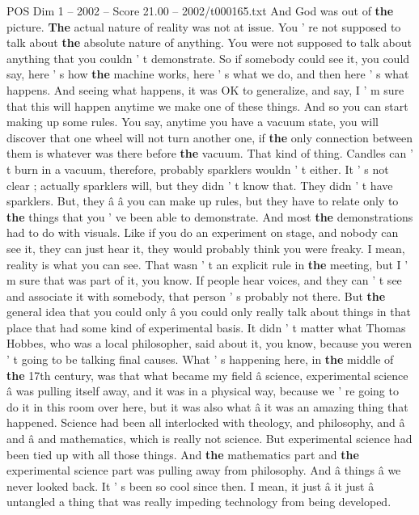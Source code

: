 \begin{textsample}{POS Dim 1 – 2002 – Score 21.00 – 2002/t000165.txt}
And God was out of \textbf{the} picture. \textbf{The} actual nature of reality was not at issue.
You ' re not supposed to talk about \textbf{the} absolute nature of anything.
You were not supposed to talk about anything that you couldn ' t demonstrate.
So if somebody could see it, you could say, here ' s how \textbf{the} machine works, here ' s what we do, and then here ' s what happens.
And seeing what happens, it was OK to generalize, and say, I ' m sure that this will happen anytime we make one of these things.
And so you can start making up some rules.
You say, anytime you have a vacuum state, you will discover that one wheel will not turn another one, if \textbf{the} only connection between them is whatever was there before \textbf{the} vacuum.
That kind of thing.
Candles can ' t burn in a vacuum, therefore, probably sparklers wouldn ' t either.
It ' s not clear ; actually sparklers will, but they didn ' t know that.
They didn ' t have sparklers.
But, they â â you can make up rules, but they have to relate only to \textbf{the} things that you ' ve been able to demonstrate.
And most \textbf{the} demonstrations had to do with visuals.
Like if you do an experiment on stage, and nobody can see it, they can just hear it, they would probably think you were freaky.
I mean, reality is what you can see.
That wasn ' t an explicit rule in \textbf{the} meeting, but I ' m sure that was part of it, you know.
If people hear voices, and they can ' t see and associate it with somebody, that person ' s probably not there.
But \textbf{the} general idea that you could only â you could only really talk about things in that place that had some kind of experimental basis.
It didn ' t matter what Thomas Hobbes, who was a local philosopher, said about it, you know, because you weren ' t going to be talking final causes.
What ' s happening here, in \textbf{the} middle of \textbf{the} 17th century, was that what became my field â science, experimental science â was pulling itself away, and it was in a physical way, because we ' re going to do it in this room over here, but it was also what â it was an amazing thing that happened.
Science had been all interlocked with theology, and philosophy, and â and â and mathematics, which is really not science.
But experimental science had been tied up with all those things.
And \textbf{the} mathematics part and \textbf{the} experimental science part was pulling away from philosophy.
And â things â we never looked back.
It ' s been so cool since then.
I mean, it just â it just â untangled a thing that was really impeding technology from being developed.

\end{textsample}
